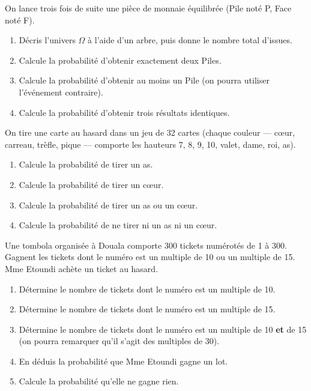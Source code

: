 \documentclass[11pt]{article}
\begin{document}
\begin{exercice}
On lance trois fois de suite une pièce de monnaie équilibrée (Pile noté P, Face noté F).
\begin{enumerate}
\item Décris l'univers $\Omega$ à l'aide d'un arbre, puis donne le nombre total d'issues.
\item Calcule la probabilité d'obtenir exactement deux Piles.
\item Calcule la probabilité d'obtenir au moins un Pile (on pourra utiliser l'événement contraire).
\item Calcule la probabilité d'obtenir trois résultats identiques.
\end{enumerate}
\end{exercice}

\begin{exercice}
On tire une carte au hasard dans un jeu de 32 cartes (chaque couleur — cœur, carreau, trèfle, pique — comporte les hauteurs 7, 8, 9, 10, valet, dame, roi, as).
\begin{enumerate}
\item Calcule la probabilité de tirer un as.
\item Calcule la probabilité de tirer un cœur.
\item Calcule la probabilité de tirer un as ou un cœur.
\item Calcule la probabilité de ne tirer ni un as ni un cœur.
\end{enumerate}
\end{exercice}

\begin{exercice}
Une tombola organisée à Douala comporte 300 tickets numérotés de 1 à 300. Gagnent les tickets dont le numéro est un multiple de 10 ou un multiple de 15. Mme Etoundi achète un ticket au hasard.
\begin{enumerate}
\item Détermine le nombre de tickets dont le numéro est un multiple de 10.
\item Détermine le nombre de tickets dont le numéro est un multiple de 15.
\item Détermine le nombre de tickets dont le numéro est un multiple de 10 \textbf{et} de 15 (on pourra remarquer qu'il s'agit des multiples de 30).
\item En déduis la probabilité que Mme Etoundi gagne un lot.
\item Calcule la probabilité qu'elle ne gagne rien.
\end{enumerate}
\end{exercice}
\end{document}
